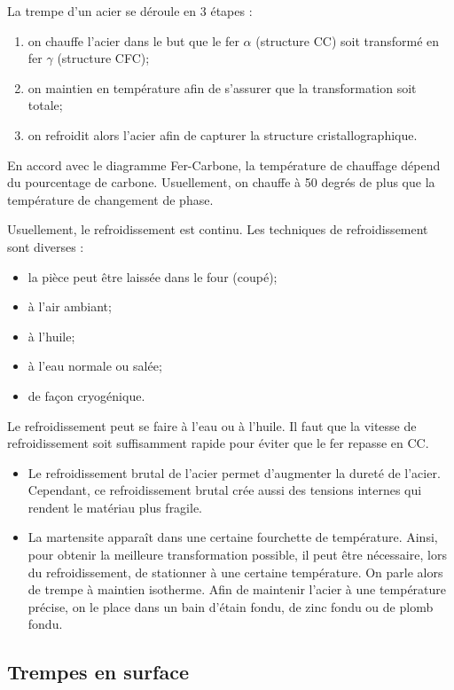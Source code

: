 \documentclass[11pt,oneside]{article}
\begin{document}
La trempe d'un acier se déroule en 3 étapes  :
\begin{enumerate}
\item on chauffe l'acier dans le but que le fer $\alpha$ (structure CC) soit transformé en fer  $\gamma$  (structure CFC);
\item on maintien en température afin de s'assurer que la transformation soit totale;
\item on refroidit alors l'acier afin de capturer la structure cristallographique.
\end{enumerate}

En accord avec le diagramme Fer-Carbone, la température de chauffage dépend du pourcentage de carbone. Usuellement, on chauffe à 50 degrés de plus que la température de changement de phase.

Usuellement, le refroidissement est continu. Les techniques de refroidissement sont diverses :
\begin{itemize}
\item la pièce peut être laissée dans le four (coupé);
\item à l'air ambiant;
\item à l'huile;
\item à l'eau normale ou salée;
\item de façon cryogénique.
\end{itemize}

Le refroidissement peut se faire à l'eau ou à l'huile. Il faut que la vitesse de refroidissement soit suffisamment rapide pour éviter que le fer repasse en CC.

\begin{rem}
\begin{itemize}
\item Le refroidissement brutal de l'acier permet d'augmenter la dureté de l'acier. Cependant, ce refroidissement brutal crée aussi des tensions internes qui rendent le matériau plus fragile. 
\item La martensite apparaît dans une certaine fourchette de température. Ainsi, pour obtenir la meilleure transformation possible, il peut être nécessaire, lors du refroidissement, de stationner à une certaine température. On parle alors de trempe à maintien isotherme. Afin de maintenir l'acier à une température précise, on le place dans un bain d'étain fondu, de zinc fondu ou de plomb fondu. 
\end{itemize}
\end{rem}

\subsection{Trempes en surface}
\end{document}
